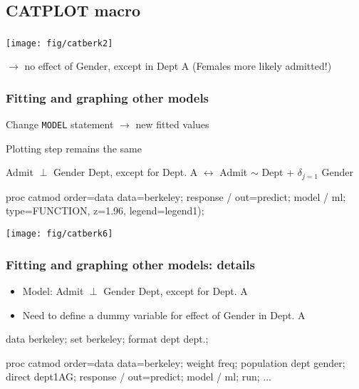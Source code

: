 \subsection{CATPLOT macro}
\begin{frame}
\frametitle{}
\begin{center}
  \texttt{[image: fig/catberk2]}
\end{center}
$\rightarrow$ no effect of Gender, except in Dept A (Females more likely admitted!)
\end{frame}

\begin{frame}[fragile]
  \frametitle{Fitting and graphing other models}
  \begin{itemize*}
  \item Change \texttt{MODEL} statement $\rightarrow$ new fitted values
  \item Plotting step remains the same
  \item Admit $\perp$ Gender \given Dept, except for Dept. A $\leftrightarrow$ Admit $\sim$  Dept + $\delta_{j=1}$ Gender
\begin{listing}
proc catmod order=data data=berkeley;
   response / out=predict;
   model  / ml;
    type=FUNCTION, z=1.96, legend=legend1);
\end{listing}

  \begin{center}
	\texttt{[image: fig/catberk6]}
  \end{center}
  \end{itemize*}
\end{frame}

\begin{frame}[fragile]
  \frametitle{Fitting and graphing other models: details}
  \begin{itemize}
  \item Model: Admit $\perp$ Gender \given Dept, except for Dept. A
  \item Need to define a dummy variable for effect of Gender in Dept. A 
  \end{itemize}
  \vspace{1ex}
\begin{Input}[fontsize=\small,label=\fbox{\texttt{catberk6.sas} $\cdots$},baselinestretch=0.75]
data berkeley;
   set berkeley;
   format dept dept.;

proc catmod order=data
            data=berkeley;
   weight freq;
   population dept gender;
   direct dept1AG;
   response / out=predict;
   model  / ml;
  run;
  ...
\end{Input}
\end{frame}


